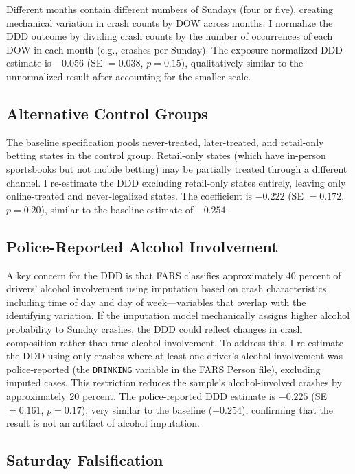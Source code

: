 \documentclass[12pt]{article}
\begin{document}
Different months contain different numbers of Sundays (four or five), creating mechanical variation in crash counts by DOW across months. I normalize the DDD outcome by dividing crash counts by the number of occurrences of each DOW in each month (e.g., crashes per Sunday). The exposure-normalized DDD estimate is $-0.056$ (SE $= 0.038$, $p = 0.15$), qualitatively similar to the unnormalized result after accounting for the smaller scale.

\subsection{Alternative Control Groups}

The baseline specification pools never-treated, later-treated, and retail-only betting states in the control group. Retail-only states (which have in-person sportsbooks but not mobile betting) may be partially treated through a different channel. I re-estimate the DDD excluding retail-only states entirely, leaving only online-treated and never-legalized states. The coefficient is $-0.222$ (SE $= 0.172$, $p = 0.20$), similar to the baseline estimate of $-0.254$.

\subsection{Police-Reported Alcohol Involvement}

A key concern for the DDD is that FARS classifies approximately 40 percent of drivers' alcohol involvement using imputation based on crash characteristics including time of day and day of week---variables that overlap with the identifying variation. If the imputation model mechanically assigns higher alcohol probability to Sunday crashes, the DDD could reflect changes in crash composition rather than true alcohol involvement. To address this, I re-estimate the DDD using only crashes where at least one driver's alcohol involvement was police-reported (the \texttt{DRINKING} variable in the FARS Person file), excluding imputed cases. This restriction reduces the sample's alcohol-involved crashes by approximately 20 percent. The police-reported DDD estimate is $-0.225$ (SE $= 0.161$, $p = 0.17$), very similar to the baseline ($-0.254$), confirming that the result is not an artifact of alcohol imputation.

\subsection{Saturday Falsification}
\end{document}
